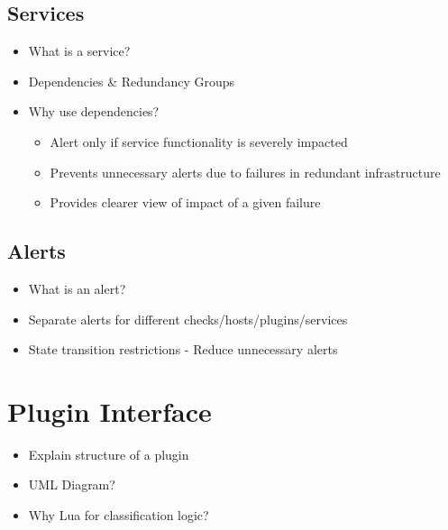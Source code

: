 \documentclass[bsc,logo,twoside]{infthesis}
\begin{document}
\subsection{Services}
\begin{itemize}
	\item What is a service?
	\item Dependencies \& Redundancy Groups
	\item Why use dependencies?
	\begin{itemize}
		\item Alert only if service functionality is severely impacted
		\item Prevents unnecessary alerts due to failures in redundant infrastructure
		\item Provides clearer view of impact of a given failure
	\end{itemize}
\end{itemize}

\subsection{Alerts}
\begin{itemize}
	\item What is an alert?
	\item Separate alerts for different checks/hosts/plugins/services
	\item State transition restrictions - Reduce unnecessary alerts
\end{itemize}

\section{Plugin Interface}
\begin{itemize}
	\item Explain structure of a plugin
	\item UML Diagram?
	\item Why Lua for classification logic?
\end{itemize}
\end{document}
